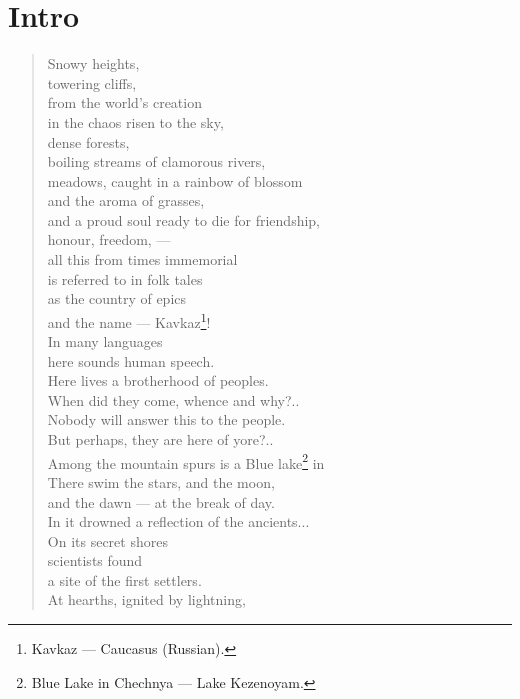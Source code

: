\documentclass[smalldemyvopaper,11pt,twoside,onecolumn,openright,extrafontsizes]{memoir}
\begin{document}
\chapter*{Intro}


\begin{verse}
Snowy heights,\\
towering cliffs,\\
from the world’s creation\\
in the chaos risen to the sky,\\
dense forests,\\
boiling streams of clamorous rivers,\\
meadows, caught in a rainbow of blossom\\
and the aroma of grasses,\\
and a proud soul ready to die for friendship,\\
honour, freedom, — \\
all this from times immemorial\\
is referred to in folk tales\\
as the country of epics\\
and the name — Kavkaz\footnote{Kavkaz — Caucasus (Russian).}!\\
In many languages\\
here sounds human speech.\\
Here lives a brotherhood of peoples.\\
When did they come, whence and why?..\\
Nobody will answer this to the people.\\
But perhaps, they are here of yore?..\\
Among the mountain spurs is a Blue lake\footnote{Blue Lake in Chechnya — Lake Kezenoyam.} in \\
There swim the stars, and the moon,\\
and the dawn  — at the break of day.\\
In it drowned a reflection of the ancients...\\
On its secret shores\\
scientists found\\
a site of the first settlers.\\
At hearths, ignited by lightning,\\

\end{verse}
\end{document}
